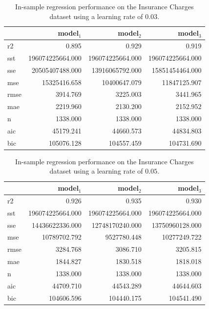 \documentclass[11pt]{article}
\begin{document}
\begin{table}[H]
\centering
\caption{In-sample regression performance on the Insurance Charges dataset using a learning rate of $0.03$.}
\label{tab:Auto_MPG_(In-Sample)}
\begin{tabular}{lrrr}
\toprule
 & model$_1$ & model$_2$ & model$_3$ \\
\midrule
r2 & 0.895 & 0.929 & 0.919 \\
sst & 196074225664.000 & 196074225664.000 & 196074225664.000 \\
sse & 20505407488.000 & 13916065792.000 & 15851454464.000 \\
mse & 15325416.658 & 10400647.079 & 11847125.907 \\
rmse & 3914.769 & 3225.003 & 3441.965 \\
mae & 2219.960 & 2130.200 & 2152.952 \\
n & 1338.000 & 1338.000 & 1338.000 \\
aic & 45179.241 & 44660.573 & 44834.803 \\
bic & 105076.128 & 104557.459 & 104731.690 \\
\bottomrule
\end{tabular}

\end{table}


\begin{table}[H]
\centering
\caption{In-sample regression performance on the Insurance Charges dataset using a learning rate of $0.05$.}
\label{tab:Auto_MPG_(In-Sample)}
\begin{tabular}{lrrr}
\toprule
 & model$_1$ & model$_2$ & model$_3$ \\
\midrule
r2 & 0.926 & 0.935 & 0.930 \\
sst & 196074225664.000 & 196074225664.000 & 196074225664.000 \\
sse & 14436622336.000 & 12748170240.000 & 13750960128.000 \\
mse & 10789702.792 & 9527780.448 & 10277249.722 \\
rmse & 3284.768 & 3086.710 & 3205.815 \\
mae & 1844.827 & 1830.518 & 1818.018 \\
n & 1338.000 & 1338.000 & 1338.000 \\
aic & 44709.710 & 44543.289 & 44644.603 \\
bic & 104606.596 & 104440.175 & 104541.490 \\
\bottomrule
\end{tabular}
\end{table}
\end{document}
